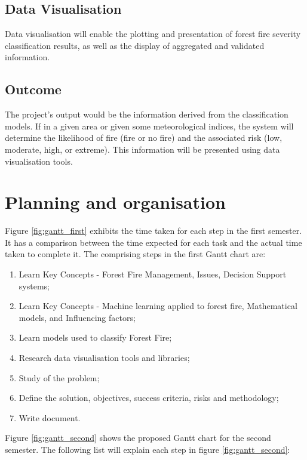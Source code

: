\subsection{Data Visualisation}
Data visualisation will enable the plotting and presentation of forest fire severity classification results, as well as the display of aggregated and validated information.


\subsection{Outcome}
The project's output would be the information derived from the classification models. If in a given area or given some meteorological indices, the system will determine the likelihood of fire (fire or no fire) and the associated risk (low, moderate, high, or extreme). This information will be presented using data visualisation tools.


\section{Planning and organisation}
Figure \ref{fig:gantt_first} exhibits the time taken for each step in the first semester. It has a comparison between the time expected for each task and the actual time taken to complete it. The comprising steps in the first Gantt chart are:
\begin{enumerate}
    \item Learn Key Concepts - Forest Fire Management, Issues, Decision Support systems;
    \item Learn Key Concepts - Machine learning applied to forest fire, Mathematical models, and Influencing factors;
    \item Learn models used to classify Forest Fire;
    \item Research data visualisation tools and libraries;
    \item Study of the problem;
    \item Define the solution, objectives, success criteria, risks and methodology;
    \item Write document.
\end{enumerate}


Figure \ref{fig:gantt_second} shows the proposed Gantt chart for the second semester. The following list will explain each step in figure \ref{fig:gantt_second}:

